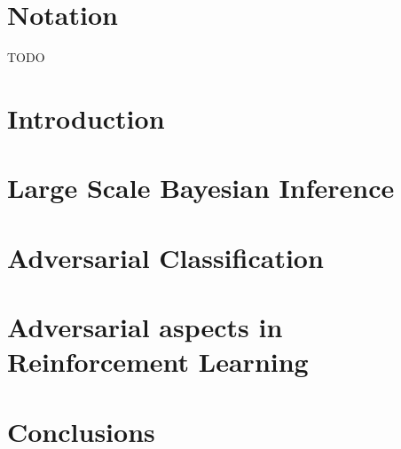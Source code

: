 \documentclass[a4paper, 11pt, openright, twoside]{reportPhD}
\numberwithin{equation}{section}
\numberwithin{figure}{chapter}
\numberwithin{table}{chapter}
\begin{document}

\indice
\indicetablas
\indicefiguras
\indicealgoritmos

\chapter*{Notation}
TODO

\chapter{Introduction}\label{cha:intro}
\setcounter{page}{1}



\chapter{Large Scale Bayesian Inference}\label{cha:bayes}



\chapter{Adversarial Classification}\label{cha:adv}



\chapter{Adversarial aspects in Reinforcement Learning}\label{cha:ararl}



\chapter{Conclusions}\label{cha:conclusions}





\begin{appendices}




%
\end{appendices}



{}
\newrefcontext[sorting=nyt]
\printbibliography
\end{document}
